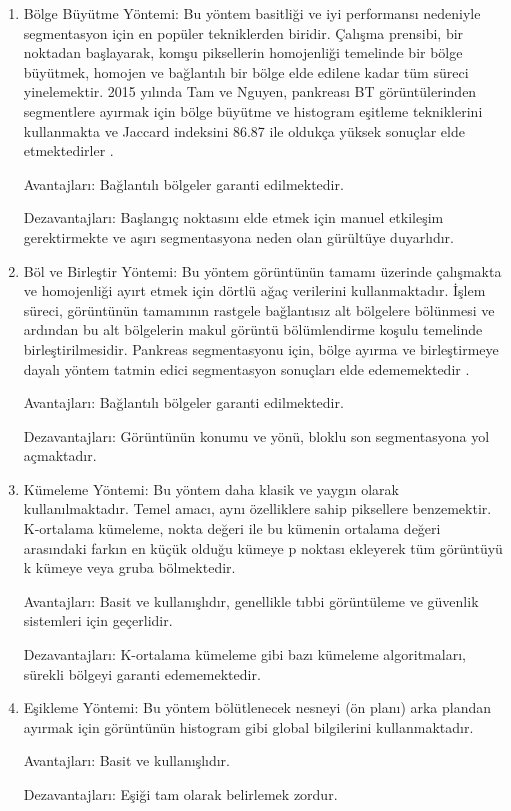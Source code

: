 \begin{enumerate}
    \item Bölge Büyütme Yöntemi: Bu yöntem basitliği ve iyi performansı nedeniyle segmentasyon için en popüler tekniklerden biridir. Çalışma prensibi, bir noktadan başlayarak, komşu piksellerin homojenliği temelinde bir bölge büyütmek, homojen ve bağlantılı bir bölge elde edilene kadar tüm süreci yinelemektir. 2015 yılında Tam ve Nguyen, pankreası BT görüntülerinden segmentlere ayırmak için bölge büyütme ve histogram eşitleme tekniklerini kullanmakta ve Jaccard indeksini 86.87 ile oldukça yüksek sonuçlar elde etmektedirler \cite{tam2014efficient}.

Avantajları: Bağlantılı bölgeler garanti edilmektedir. 

Dezavantajları: Başlangıç noktasını elde etmek için manuel etkileşim gerektirmekte ve aşırı segmentasyona neden olan gürültüye duyarlıdır. 

    \item Böl ve Birleştir Yöntemi: Bu yöntem görüntünün tamamı üzerinde çalışmakta ve homojenliği ayırt etmek için dörtlü ağaç verilerini kullanmaktadır. İşlem süreci, görüntünün tamamının rastgele bağlantısız alt bölgelere bölünmesi ve ardından bu alt bölgelerin makul görüntü bölümlendirme koşulu temelinde birleştirilmesidir. Pankreas segmentasyonu için, bölge ayırma ve birleştirmeye dayalı yöntem tatmin edici segmentasyon sonuçları elde edememektedir \cite{farag2017automatic}. 

    Avantajları: Bağlantılı bölgeler garanti edilmektedir. 

    Dezavantajları: Görüntünün konumu ve yönü, bloklu son segmentasyona yol açmaktadır.
    
    \item Kümeleme Yöntemi: Bu yöntem daha klasik ve yaygın olarak kullanılmaktadır. Temel amacı, aynı özelliklere sahip piksellere benzemektir. K-ortalama kümeleme, nokta değeri ile bu kümenin ortalama değeri arasındaki farkın en küçük olduğu kümeye p noktası ekleyerek tüm görüntüyü k kümeye veya gruba bölmektedir.

    Avantajları: Basit ve kullanışlıdır, genellikle tıbbi görüntüleme ve güvenlik sistemleri için geçerlidir.

    Dezavantajları: K-ortalama kümeleme gibi bazı kümeleme algoritmaları, sürekli bölgeyi garanti edememektedir. 

    \item Eşikleme Yöntemi: Bu yöntem bölütlenecek nesneyi (ön planı) arka plandan ayırmak için görüntünün histogram gibi global bilgilerini kullanmaktadır. 
    
    Avantajları: Basit ve kullanışlıdır.

    Dezavantajları: Eşiği tam olarak belirlemek zordur. 

\end{enumerate}


